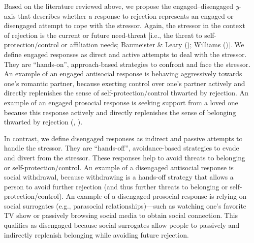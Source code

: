 \documentclass[
]{udthesis}
\begin{document}
Based on the literature reviewed above, we propose the
engaged--disengaged \emph{y}-axis that describes whether a response to
rejection represents an engaged or disengaged attempt to cope with the
stressor. Again, the stressor in the context of rejection is the current
or future need-threat {[}i.e., the threat to self-protection/control or
affiliation needs; Baumeister \& Leary ();
Williams (){]}. We define engaged responses
as direct and active attempts to deal with the stressor. They are
``hands-on'', approach-based strategies to confront and face the stressor.
An example of an engaged antisocial response is behaving aggressively
towards one's romantic partner, because exerting control over one's
partner actively and directly replenishes the sense of
self-protection/control thwarted by rejection. An example of an engaged
prosocial response is seeking support from a loved one because this
response actively and directly replenishes the sense of belonging
thwarted by rejection (, ).

In contrast, we define disengaged responses as indirect and passive
attempts to handle the stressor. They are ``hands-off'', avoidance-based
strategies to evade and divert from the stressor. These responses help
to avoid threats to belonging or self-protection/control. An example of
a disengaged antisocial response is social withdrawal, because
withdrawing is a hands-off strategy that allows a person to avoid
further rejection (and thus further threats to belonging or
self-protection/control). An example of a disengaged prosocial response
is relying on social surrogates (e.g., parasocial relationships)---such
as watching one's favorite TV show or passively browsing social media to
obtain social connection. This qualifies as disengaged because social
surrogates allow people to passively and indirectly replenish belonging
while avoiding future rejection.
\end{document}
